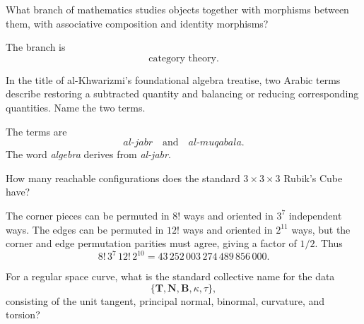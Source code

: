    \begin{expectedproblem}
        What branch of mathematics studies objects together with morphisms
        between them, with associative composition and identity morphisms?
    \end{expectedproblem}

    \begin{solution}
        The branch is
        \[
            \boxed{\text{category theory}}.
        \]
    \end{solution}

    \begin{expectedproblem}
        In the title of al-Khwarizmi's foundational algebra treatise, two Arabic
        terms describe restoring a subtracted quantity and balancing or
        reducing corresponding quantities. Name the two terms.
    \end{expectedproblem}

    \begin{solution}
        The terms are
        \[
            \boxed{\textit{al-jabr}\quad\text{and}\quad\textit{al-muqabala}}.
        \]
        The word \emph{algebra} derives from \emph{al-jabr}.
    \end{solution}

    \begin{expectedproblem}
        How many reachable configurations does the standard $3\times3\times3$
        Rubik's Cube have?
    \end{expectedproblem}

    \begin{solution}
        The corner pieces can be permuted in $8!$ ways and oriented in $3^7$
        independent ways. The edges can be permuted in $12!$ ways and oriented
        in $2^{11}$ ways, but the corner and edge permutation parities must
        agree, giving a factor of $1/2$. Thus
        \[
            8!\,3^7\,12!\,2^{10}
            =
            \boxed{43\,252\,003\,274\,489\,856\,000}.
        \]
    \end{solution}

    \begin{expectedproblem}
        For a regular space curve, what is the standard collective name for the
        data
        \[
            \{\mathbf{T},\mathbf{N},\mathbf{B},\kappa,\tau\},
        \]
        consisting of the unit tangent, principal normal, binormal, curvature,
        and torsion?
    \end{expectedproblem}

